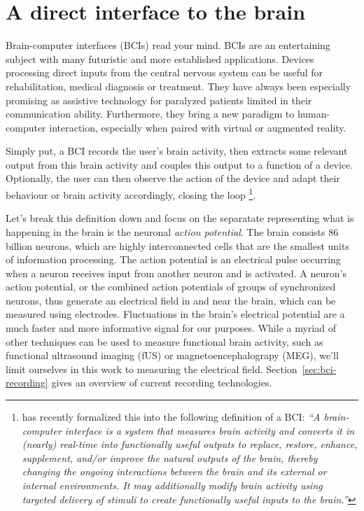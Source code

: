 

\section{A direct interface to the brain}

Brain-computer interfaces (BCIs) read your mind.
BCIs are an entertaining subject with many futuristic and more established
applications.
Devices processing direct inputs from the central nervous system can be
useful for rehabilitation, medical diagnosis or treatment.
They have always been especially promising as assistive technology for
paralyzed patients limited in their communication ability. 
Furthermore, they bring a new paradigm to human-computer interaction,
especially when paired with virtual or augmented reality.

Simply put, a BCI records the user's brain activity, then extracts some
relevant output from this brain activity and couples this output to a function
of a device.
Optionally, the user can then observe the action of the device and adapt their
behaviour or brain activity accordingly, closing the loop
\footnote{
  \textcite{BCISociety2024} has recently formalized this into the
  following definition of a BCI:
  \it``A brain-computer interface is a system that measures brain activity and
  converts it in (nearly) real-time into functionally useful outputs to replace,
  restore, enhance, supplement, and/or improve the natural outputs of the brain,
  thereby changing the ongoing interactions between the brain and its external or
  internal environments. It may additionally modify brain activity using targeted
  delivery of stimuli to create functionally useful inputs to the
  brain.''
}.


Let's break this definition down and focus on the separatate representing what is happening in the brain
is the neuronal \textit{action potential}.
The brain consists 86 billion neurons, which are highly interconnected cells that are
the smallest units of information processing.
The action potential is an electrical pulse occurring when a neuron receives
input from another neuron and is activated.
A neuron's action potential, or the combined action potentials of groups of
synchronized neurons, thus generate an electrical field in and near the brain,
which can be measured using electrodes.
Fluctuations in the brain's electrical potential are a much faster and more
informative signal for our purposes.
While a myriad of other techniques can be used to measure functional brain
activity, such as functional ultrasound imaging (fUS) or magnetoencephalograpy
(MEG), we'll limit ourselves in this work to measuring the electrical field.
Section~\ref{sec:bci-recording} gives an overview of current recording
technologies.


